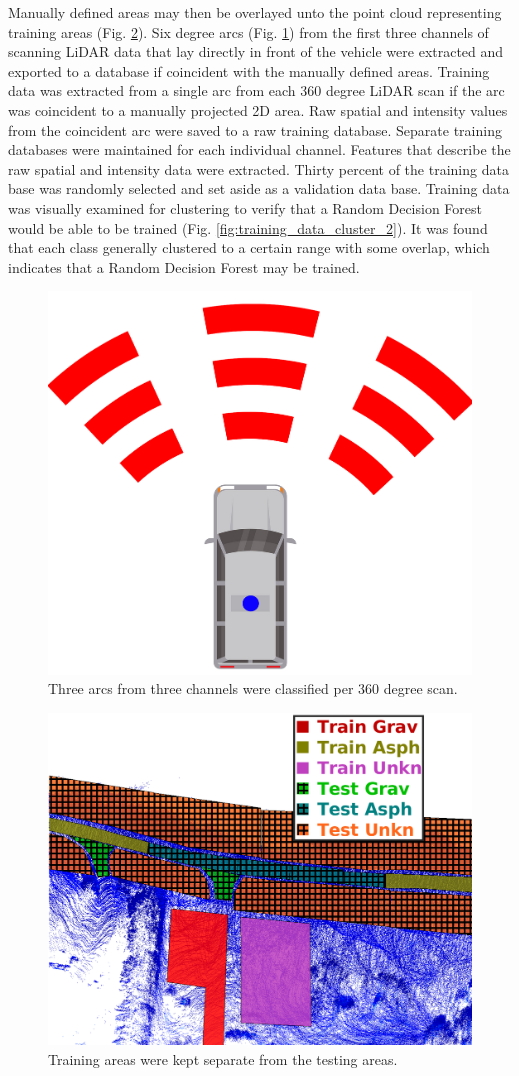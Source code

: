 \documentclass[journal,onecolumn]{IEEEtran}
\begin{document}
			{Manually defined areas may then be overlayed unto the point cloud representing training areas (Fig. \ref{fig:test_vs_train_areas}). Six degree arcs (Fig. \ref{fig:area_example}) from the first three channels of scanning LiDAR data that lay directly in front of the vehicle were extracted and exported to a database if coincident with the manually defined areas. Training data was extracted from a single arc from each 360 degree LiDAR scan if the arc was coincident to a manually projected 2D area. Raw spatial and intensity values from the coincident arc were saved to a raw training database. Separate training databases were maintained for each individual channel. Features that describe the raw spatial and intensity data were extracted. Thirty percent of the training data base was randomly selected and set aside as a validation data base. Training data was visually examined for clustering to verify that a Random Decision Forest would be able to be trained (Fig. \ref{fig:training_data_cluster_2}). It was found that each class generally clustered to a certain range with some overlap, which indicates that a Random Decision Forest may be trained.}
			
			\begin{figure}[H]
				\centering
				\includegraphics[width=0.25\linewidth]{figures/area_example}
				\caption[Areas to Classify]{Three arcs from three channels were classified per 360 degree scan. }
				\label{fig:area_example}
			\end{figure}
		
			\begin{figure}[H]
				\centering
				\includegraphics[width=0.75\linewidth]{figures/test_vs_train_areas_hatch}
				\caption[Training vs Testing Areas]{Training areas were kept separate from the testing areas.}
				\label{fig:test_vs_train_areas}
			\end{figure}
			
\end{document}

